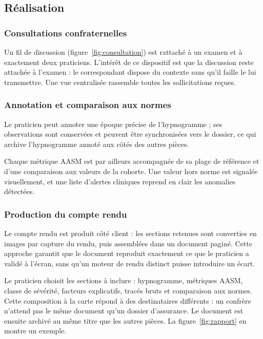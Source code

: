 \subsection{Réalisation}

\subsubsection{Consultations confraternelles}

Un fil de discussion (figure~\ref{fig:consultation}) est rattaché à un examen et à
exactement deux praticiens. L'intérêt de ce
dispositif est que la discussion reste attachée à l'examen : le correspondant dispose du
contexte sans qu'il faille le lui transmettre. Une vue centralisée rassemble toutes les
sollicitations reçues.


\subsubsection{Annotation et comparaison aux normes}

Le praticien peut annoter une époque précise de l'hypnogramme ; ses observations sont
conservées et peuvent être synchronisées vers le dossier, ce qui archive l'hypnogramme annoté
aux côtés des autres pièces.

Chaque métrique AASM est par ailleurs accompagnée de sa plage de référence et d'une comparaison
aux valeurs de la cohorte. Une valeur hors norme est signalée visuellement, et une liste
d'alertes cliniques reprend en clair les anomalies détectées.

\subsubsection{Production du compte rendu}

Le compte rendu est produit côté client : les sections retenues sont converties en images par
capture du rendu, puis assemblées dans un document paginé. Cette approche garantit que le
document reproduit exactement ce que le praticien a validé à l'écran, sans qu'un moteur de
rendu distinct puisse introduire un écart.

Le praticien choisit les sections à inclure : hypnogramme, métriques AASM, classe de sévérité,
facteurs explicatifs, tracés bruts et comparaison aux normes. Cette composition à la carte
répond à des destinataires différents : un confrère n'attend pas le même document qu'un
dossier d'assurance. Le document est ensuite archivé au même titre que les autres pièces.
La figure~\ref{fig:rapport} en montre un exemple.

